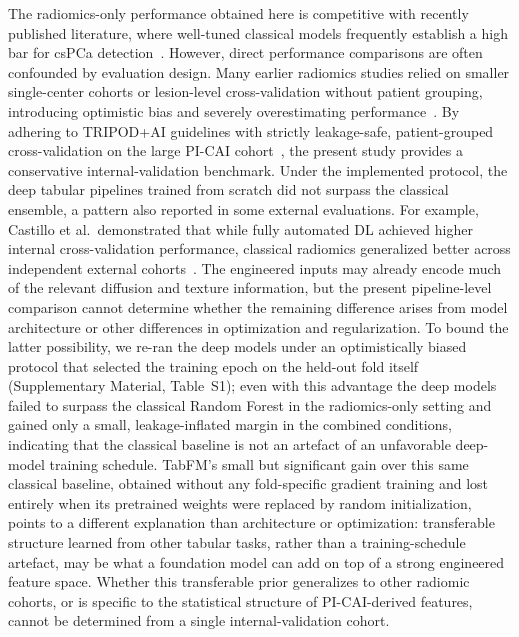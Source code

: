 \documentclass[11pt]{article}
\begin{document}
The radiomics-only performance obtained here is competitive with recently published
literature, where well-tuned classical models frequently establish a high bar for csPCa
detection~\citep{cuocolo2021machine,Bao2024,Lucia2024}. However, direct performance comparisons
are often confounded by evaluation design. Many earlier radiomics studies relied on smaller
single-center cohorts or lesion-level cross-validation without patient grouping, introducing
optimistic bias and severely overestimating performance~\citep{Quality2022}. By adhering to
TRIPOD+AI guidelines with strictly leakage-safe, patient-grouped cross-validation on the
large PI-CAI cohort~\citep{collins2024tripodai,saha2023artificial}, the present study provides a conservative
internal-validation benchmark. Under the implemented protocol, the deep tabular
pipelines trained from scratch did not surpass the classical ensemble, a
pattern also reported in some external evaluations.
For example, Castillo et al.\ demonstrated that while fully automated DL achieved higher internal
cross-validation performance, classical radiomics generalized better across independent external
cohorts~\citep{Castillo2022Cancers}. The engineered inputs may already encode
much of the relevant diffusion and texture information, but the present
pipeline-level comparison cannot determine whether the remaining difference
arises from model architecture or other differences in optimization and
regularization. To bound the latter possibility, we re-ran the deep models under
an optimistically biased protocol that selected the training epoch on the
held-out fold itself (Supplementary Material, Table~S1); even with this advantage the
deep models failed to surpass the classical Random Forest in the radiomics-only
setting and gained only a small, leakage-inflated margin in the combined
conditions, indicating that the classical baseline is not an artefact of an
unfavorable deep-model training schedule. TabFM's small but significant gain
over this same classical baseline, obtained without any fold-specific gradient
training and lost entirely when its pretrained weights were replaced by random
initialization, points to a different explanation than architecture or
optimization: transferable structure learned from other tabular tasks, rather
than a training-schedule artefact, may be what a foundation model can add on
top of a strong engineered feature space. Whether this transferable prior
generalizes to other radiomic cohorts, or is specific to the statistical
structure of PI-CAI-derived features, cannot be determined from a single
internal-validation cohort.
\end{document}
